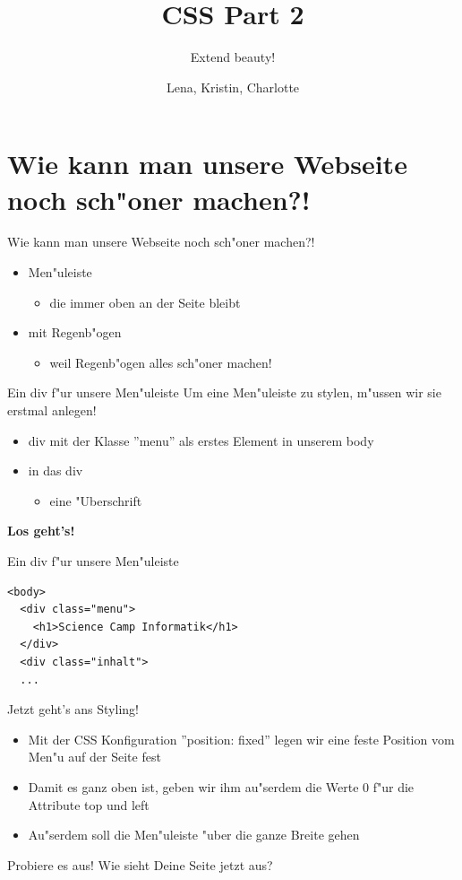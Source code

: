 \documentclass[18pt]{beamer}
\title[CSS Part 2]{CSS Part 2}
\subtitle{Extend beauty!}
\author{Lena, Kristin, Charlotte}
\begin{document}

\begin{frame}
\titlepage
\end{frame}

\section {Wie kann man unsere Webseite noch sch"oner machen?!}
\begin{frame}{Wie kann man unsere Webseite noch sch"oner machen?!}
\begin {itemize}
\item Men"uleiste
\begin{itemize}
\item die immer \glqq oben \grqq an der Seite bleibt
\end{itemize}
\pause
\item mit Regenb"ogen
\begin{itemize}
\item weil Regenb"ogen alles sch"oner machen!
\end{itemize}
\end {itemize}
\end{frame}

\begin{frame}[fragile]{Ein div f"ur unsere Men"uleiste}
Um eine Men"uleiste zu stylen, m"ussen wir sie erstmal anlegen!
\begin {itemize}
\item div mit der Klasse ''menu'' als erstes Element in unserem body
\item in das div 
\begin{itemize}
\item eine "Uberschrift
\end{itemize}
\end{itemize}
\pause
\textbf{Los geht's!}
\end{frame}

\begin{frame}[fragile]{Ein div f"ur unsere Men"uleiste}
\begin{lstlisting}
<body>
  <div class="menu">
    <h1>Science Camp Informatik</h1>
  </div>
  <div class="inhalt">
  ...
\end{lstlisting}
\end{frame}

\begin{frame}[fragile]{Jetzt geht's ans Styling!}
\begin{itemize}
\item Mit der CSS Konfiguration ''position: fixed'' legen wir eine feste Position vom Men"u auf der Seite fest
\item Damit es ganz oben ist, geben wir ihm au"serdem die Werte 0 f"ur die Attribute top und left
\item Au"serdem soll die Men"uleiste "uber die ganze Breite gehen
\end{itemize}
\pause
Probiere es aus! Wie sieht Deine Seite jetzt aus?
\end{frame}
\end{document}
